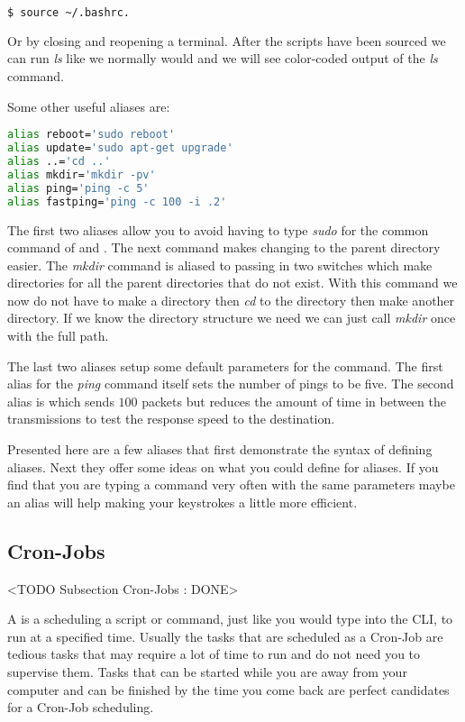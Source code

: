 \begin{lstlisting}[language=bash]
	$ source ~/.bashrc.
\end{lstlisting}

Or by closing and reopening a terminal. After the scripts have been sourced we can run \emph{ls} like we normally would and we will see color-coded output of the \emph{ls} command. 

Some other useful aliases are:

\begin{lstlisting}[language=bash]
alias reboot='sudo reboot'
alias update='sudo apt-get upgrade'
alias ..='cd ..'
alias mkdir='mkdir -pv'
alias ping='ping -c 5'
alias fastping='ping -c 100 -i .2'
\end{lstlisting}
	
The first two aliases allow you to avoid having to type \emph{sudo} for the common command of \emph{} and \emph{}. The next command makes changing to the parent directory easier. The \emph{mkdir} command is aliased to passing in two switches which make directories for all the parent directories that do not exist. With this command we now do not have to make a directory then \emph{cd} to the directory then make another directory. If we know the directory structure we need we can just call \emph{mkdir} once with the full path. 

The last two aliases setup some default parameters for the \emph{} command. The first alias for the \emph{ping} command itself sets the number of pings to be five. The second alias is \emph{} which sends $100$ packets but reduces the amount of time in between the transmissions to test the response speed to the destination. 

Presented here are a few aliases that first demonstrate the syntax of defining aliases. Next they offer some ideas on what you could define for aliases. If you find that you are typing a command very often with the same parameters maybe an alias will help making your keystrokes a little more efficient. 
	
\subsection{Cron-Jobs}
	<TODO Subsection Cron-Jobs : DONE>

A  is a scheduling a script or command, just like you would type into the \ac{CLI}, to run at a specified time. Usually the tasks that are scheduled as a Cron-Job are tedious tasks that may require a lot of time to run and do not need you to supervise them. Tasks that can be started while you are away from your computer and can be finished by the time you come back are perfect candidates for a Cron-Job scheduling. 
	
